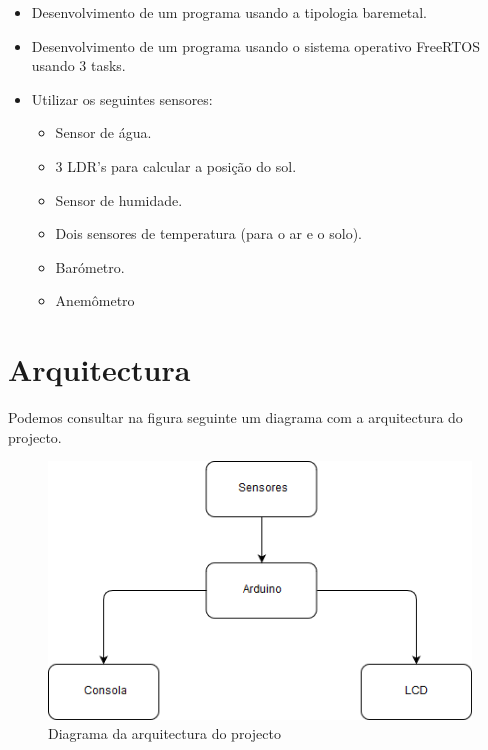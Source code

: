 \documentclass[11pt]{report}
\begin{document}
\begin{itemize}
\item Desenvolvimento de um programa usando a tipologia baremetal.
\item Desenvolvimento de um programa usando o sistema operativo FreeRTOS usando 3 tasks.
\item Utilizar os seguintes sensores:
\begin{itemize}
\item Sensor de água.
\item 3 LDR's para calcular a posição do sol.
\item Sensor de humidade.
\item Dois sensores de temperatura (para o ar e o solo).
\item Barómetro.
\item Anemômetro 
\end{itemize}
\end{itemize}


\clearpage


\chapter*{Arquitectura}

Podemos consultar na figura seguinte um diagrama com a arquitectura do projecto.


\begin{figure} [!h]
\centering
\includegraphics[width=\textwidth]{Prints/arquitectura.png}
\caption{Diagrama da arquitectura do projecto}
\label{Rotulo}
\end{figure}


\clearpage


\end{document}
